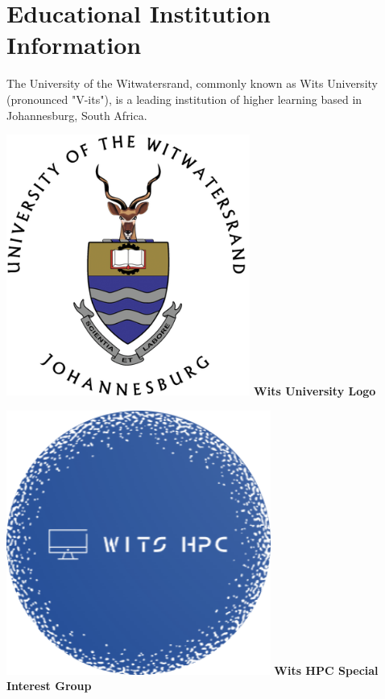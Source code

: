 \documentclass[10pt, onecolumn]{IEEEtran}
\begin{document}
\section{Educational Institution Information}
\noindent
The University of the Witwatersrand, commonly known as Wits University (pronounced "V-its"), is a leading institution of higher learning based in Johannesburg, South Africa.

\vspace{0.05\textwidth}
\noindent
\begin{minipage}{0.45\textwidth}
  \centering
  \includegraphics[width=0.6\textwidth]{wits_logo.png}
  \textbf{Wits University Logo} 
\end{minipage}
\hspace{0.05\textwidth} %
\begin{minipage}{0.45\textwidth}
  \centering
  \includegraphics[width=0.65\textwidth]{witshpc_logo_transparentbkg.png}
  \textbf{Wits HPC Special Interest Group} 
\end{minipage}
\\\\
\end{document}
